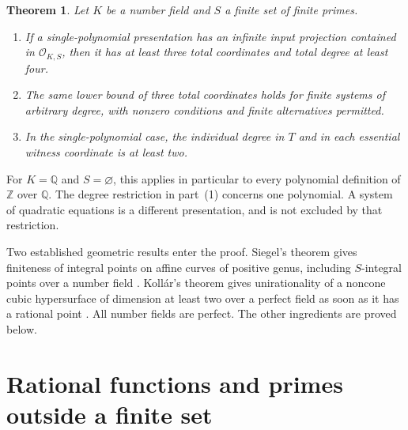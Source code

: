 \documentclass[11pt,a4paper]{article}
\newtheorem{theorem}{Theorem}[section]
\theoremstyle{definition}
\newcommand{\OKS}{\mathcal O_{K,S}}
\begin{document}
\begin{samepage}
\begin{theorem}\label{lb:main}
Let $K$ be a number field and $S$ a finite set of finite primes.
\begin{enumerate}
\item If a single-polynomial presentation has an infinite input
projection contained in $\OKS$, then it has at least three total
coordinates and total degree at least four.
\item The same lower bound of three total coordinates holds for
finite systems of arbitrary degree, with nonzero conditions and finite
alternatives permitted.
\item In the single-polynomial case, the individual degree in $T$
and in each essential witness coordinate is at least two.
\end{enumerate}
\end{theorem}
\end{samepage}

For $K=\mathbb Q$ and $S=\varnothing$, this applies in particular
to every polynomial definition of $\mathbb Z$ over $\mathbb Q$.
The degree restriction in part~(1) concerns one polynomial. A system
of quadratic equations is a different presentation, and is not
excluded by that restriction.

Two established geometric results enter the proof. Siegel's theorem
gives finiteness of integral points on affine curves of positive
genus, including $S$-integral points over a number field
\cite[Chapter~8]{Lang}. Koll\'ar's theorem gives unirationality of a
noncone cubic hypersurface of dimension at least two over a perfect
field as soon as it has a rational point \cite[Theorem~2]{Kollar}.
All number fields are perfect. The other ingredients are proved below.

\section{Rational functions and primes outside a finite set}
\end{document}
